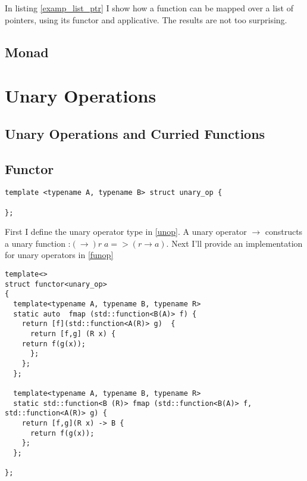 \documentclass[12pt,fleqn]{article}
\begin{document}
In listing \ref{examp_list_ptr} I show how a function can be mapped over a list of pointers, using its functor and applicative.
The results are not too surprising.

%
%
\subsection{Monad}

%
%
\section{Unary Operations}
%
%

\subsection{Unary Operations and Curried Functions}

\subsection{Functor}

%
%
%
\begin{minipage}{\linewidth}
\begin{lstlisting}[caption=unary operator, label=unop]
template <typename A, typename B> struct unary_op {
  
};
\end{lstlisting}
\end{minipage}
%
%
%

First I define the unary operator type in \ref{unop}.
A unary operator $\rightarrow$ constructs a unary function :$(\rightarrow) r\;a => (r \rightarrow a)$.
Next I'll provide an implementation for unary operators in \ref{funop}

%
%
%
\begin{minipage}{\linewidth}
\begin{lstlisting}[caption=functor for unary operators, label=funop]
template<>
struct functor<unary_op>
{
  template<typename A, typename B, typename R>
  static auto  fmap (std::function<B(A)> f) {  
    return [f](std::function<A(R)> g)  {
      return [f,g] (R x) {
	return f(g(x));
      };
    };
  };

  template<typename A, typename B, typename R>
  static std::function<B (R)> fmap (std::function<B(A)> f, std::function<A(R)> g) {  
    return [f,g](R x) -> B {
      return f(g(x));
    };
  };

};
\end{lstlisting}
\end{minipage}
%
%
%
\end{document}
